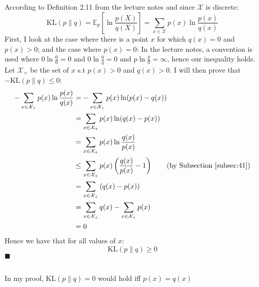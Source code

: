 \documentclass[a4paper]{article}
\newcommand*{\QEDA}{\hfill\ensuremath{\blacksquare}}%
\begin{document}
\subsection{}
\label{subsec:42}
According to Definition 2.11 from the lecture notes and since
$\mathcal{X}$ is discrete:
\[
\mathrm{KL}(p \| q)=\mathbb{E}_{p}\left[\ln \frac{p(X)}{q(X)}\right]
= \sum_{x \in \mathcal{X}} p(x) \ln \frac{p(x)}{q(x)}
\]
First, I look at the case where there is a point $x$ for which
$q(x) = 0$ and $p(x) > 0$; and the case where $p(x) = 0$:
In the lecture notes, a convention is used where
$0 \ln \frac{0}{0}=0 \text { and } 0 \ln \frac{0}{q}=0 \text{ and } p \ln \frac{p}{0}=\infty$,
hence our inequality holds.
\newpage
Let $\mathcal{X}_+$ be the set of $x$ s.t $p(x)>0$ and $q(x)>0$. I will then
prove that $-\mathrm{KL}(p \| q) \leq 0$:
\begin{align*}
  -\sum_{x \in \mathcal{X}_{+}} p(x) \ln \frac{p(x)}{q(x)}
  &=    -\sum_{x \in \mathcal{X}_+} p(x) \ln (p(x) - q(x)) \\
  &= \sum_{x \in \mathcal{X}_+} p(x) \ln (q(x) - p(x)) \\
  &= \sum_{x \in \mathcal{X}_+} p(x) \ln \frac{q(x)}{p(x)} \\
  &\leq \sum_{x \in \mathcal{X}_+} p(x)\left(\frac{q(x)}{p(x)}-1\right)
  \tag{by Subsection \ref{subsec:41}}\\
  &= \sum_{x \in \mathcal{X}_+} \left(q(x) - p(x)\right) \\
  &= \sum_{x \in \mathcal{X}_+} q(x) - \sum_{x \in \mathcal{X}_+} p(x)\\
  &= 0
\end{align*}
Hence we have that for all values of $x$:
\[
\mathrm{KL}(p \| q) \geq 0
\]
\QEDA

\subsection{}
\label{subsec:43}
In my proof, $\mathrm{KL}(p \| q)=0$ would hold iff $p(x) = q(x)$
\end{document}
